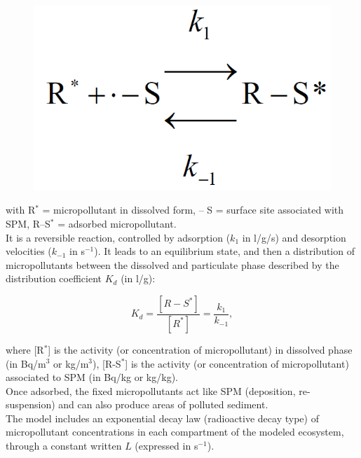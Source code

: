 \begin{figure}[H]
  \centering
  \includegraphics[scale=0.4]{graphics/image60.png}
\end{figure}


with R$^\ast$ = micropollutant in dissolved form, – S = surface site associated with SPM,
R–S$^{\ast}$ = adsorbed micropollutant.\\

It is a reversible reaction, controlled by adsorption ($k_1$ in l/g/s)
and desorption velocities ($k_{-1}$ in s$^{-1}$).
It leads to an equilibrium state, and then a distribution of micropollutants
between the dissolved and particulate phase described
by the distribution coefficient $K_d$ (in l/g):

\begin{equation}
  K_d = \frac{[R-S^\ast]}{[R^\ast]} = \frac{k_1}{k_{-1}},
\end{equation}

where [R$^\ast$] is the activity (or concentration of micropollutant)
in dissolved phase (in Bq/m$^3$ or kg/m$^3$), [R-S$^\ast$] is the activity
(or concentration of micropollutant) associated to SPM (in Bq/kg or kg/kg).\\

Once adsorbed, the fixed micropollutants act like SPM (deposition, re-suspension)
and can also produce areas of polluted sediment.\\

The model includes an exponential decay law (radioactive decay type) of micropollutant
concentrations in each compartment of the modeled ecosystem,
through a constant written $L$ (expressed in s$^{-1}$).\\

